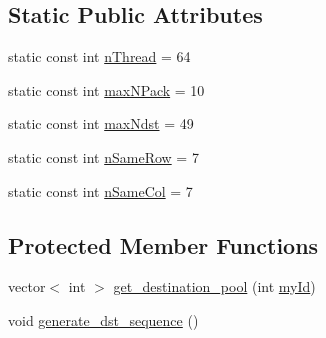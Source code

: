 \subsection*{Static Public Attributes}
\begin{DoxyCompactItemize}
\item 
static const int \hyperlink{classRlmpiInitializer_aceb31c8ff47245399cb18dcfc8626c20}{nThread} = 64
\item 
static const int \hyperlink{classRlmpiInitializer_a3bf232598cd9fdeef1b78ae507820791}{maxNPack} = 10
\item 
static const int \hyperlink{classRlmpiInitializer_adffbc4f1500291e24690d672d3e13905}{maxNdst} = 49
\item 
static const int \hyperlink{classRlmpiInitializer_ac01444ed7479351125ec33d82d271748}{nSameRow} = 7
\item 
static const int \hyperlink{classRlmpiInitializer_aa3b6fd48245fb774ca1a6bbc17446427}{nSameCol} = 7
\end{DoxyCompactItemize}
\subsection*{Protected Member Functions}
\begin{DoxyCompactItemize}
\item 
vector$<$ int $>$ \hyperlink{classRlmpiInitializer_a4b50739703f39a77d03b223ac5f79cf6}{get\_\-destination\_\-pool} (int \hyperlink{vertex2EdgeIter__slave_8c_aeaf12029768109487cb0540ba258af5a}{myId})
\item 
void \hyperlink{classRlmpiInitializer_a50e9169843eaa848e5bff8ec3859a990}{generate\_\-dst\_\-sequence} ()
\end{DoxyCompactItemize}
